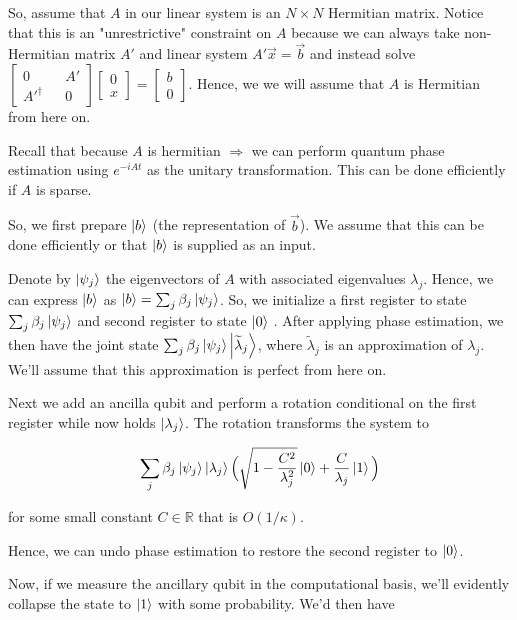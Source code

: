 \documentclass[11pt]{article}
\newcommand\0{\mathbf{0}}
\newcommand\RR{\mathbb{R}}
\newcommand\<{\langle}
\renewcommand\>{\rangle}
\renewcommand\implies{\Rightarrow}
\begin{document}
So, assume that $A$ in our linear system is an $N \times N$ Hermitian matrix. Notice that this is an "unrestrictive" constraint on $A$ because we can always take non-Hermitian matrix $A'$ and linear system $A' \vec{x} = \vec{b}$ and instead solve $\begin{bmatrix}
	0 && A' \\ A'^\dag && 0
\end{bmatrix} \begin{bmatrix} 0 \\ x \end{bmatrix} = \begin{bmatrix} b \\ 0 \end{bmatrix}$. Hence, we we will assume that $A$ is Hermitian from here on. 

Recall that because $A$ is hermitian $\implies$ we can perform quantum phase estimation using $e^{-iAt}$ as the unitary transformation. This can be done efficiently if $A$ is sparse.

So, we first prepare $\ket{b}$ (the representation of $\vec{b}$). We assume that this can be done efficiently or that $\ket{b}$ is supplied as an input.

Denote by $\ket{\psi_j}$ the eigenvectors of $A$ with associated eigenvalues $\lambda_j$. Hence, we can express $\ket{b}$ as $\ket{b} = \sum_j \beta_j \ket{\psi_j}$.  So, we initialize a first register to state $\sum_j \beta_j \ket{\psi_j}$ and second register to state $\ket{0}$ . After applying phase estimation, we then have the joint state $\sum_j \beta_j \ket{\psi_j} \ket{\widetilde{\lambda}_j}$, where $\widetilde{\lambda}_j$ is an approximation of $\lambda_j$. We'll assume that this approximation is perfect from here on. 

Next we add an ancilla qubit and perform a rotation conditional on the first register while now holds $\ket{\lambda_j}$. The rotation transforms the system to

\begin{align*}
\sum_j \beta_j \ket{\psi_j} \ket{\lambda_j} \Big(\sqrt{1-\frac{C^2}{\lambda_j^2}}\ket{0} + \frac{C}{\lambda_j}\ket{1}\Big)
\end{align*}

for some small constant $C \in \RR$ that is $O(1/\kappa)$.

Hence, we can undo phase estimation to restore the second register to $\ket{0}$.

Now, if we measure the ancillary qubit in the computational basis, we'll evidently collapse the state to $\ket{1}$ with some probability. We'd then have
\end{document}
